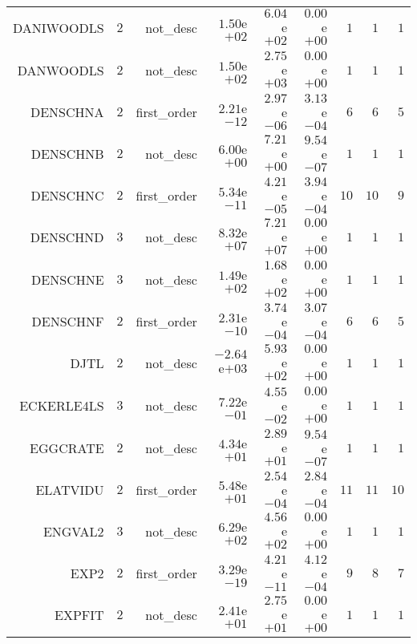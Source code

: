 \begin{longtable}{rrrrrrrrr}
DANIWOODLS & \(     2\) & not\_desc & \( 1.50\)e\(+02\) & \( 6.04\)e\(+02\) & \( 0.00\)e\(+00\) & \(     1\) & \(     1\) & \(     1\) \\
DANWOODLS & \(     2\) & not\_desc & \( 1.50\)e\(+02\) & \( 2.75\)e\(+03\) & \( 0.00\)e\(+00\) & \(     1\) & \(     1\) & \(     1\) \\
DENSCHNA & \(     2\) & first\_order & \( 2.21\)e\(-12\) & \( 2.97\)e\(-06\) & \( 3.13\)e\(-04\) & \(     6\) & \(     6\) & \(     5\) \\
DENSCHNB & \(     2\) & not\_desc & \( 6.00\)e\(+00\) & \( 7.21\)e\(+00\) & \( 9.54\)e\(-07\) & \(     1\) & \(     1\) & \(     1\) \\
DENSCHNC & \(     2\) & first\_order & \( 5.34\)e\(-11\) & \( 4.21\)e\(-05\) & \( 3.94\)e\(-04\) & \(    10\) & \(    10\) & \(     9\) \\
DENSCHND & \(     3\) & not\_desc & \( 8.32\)e\(+07\) & \( 7.21\)e\(+07\) & \( 0.00\)e\(+00\) & \(     1\) & \(     1\) & \(     1\) \\
DENSCHNE & \(     3\) & not\_desc & \( 1.49\)e\(+02\) & \( 1.68\)e\(+02\) & \( 0.00\)e\(+00\) & \(     1\) & \(     1\) & \(     1\) \\
DENSCHNF & \(     2\) & first\_order & \( 2.31\)e\(-10\) & \( 3.74\)e\(-04\) & \( 3.07\)e\(-04\) & \(     6\) & \(     6\) & \(     5\) \\
DJTL & \(     2\) & not\_desc & \(-2.64\)e\(+03\) & \( 5.93\)e\(+02\) & \( 0.00\)e\(+00\) & \(     1\) & \(     1\) & \(     1\) \\
ECKERLE4LS & \(     3\) & not\_desc & \( 7.22\)e\(-01\) & \( 4.55\)e\(-02\) & \( 0.00\)e\(+00\) & \(     1\) & \(     1\) & \(     1\) \\
EGGCRATE & \(     2\) & not\_desc & \( 4.34\)e\(+01\) & \( 2.89\)e\(+01\) & \( 9.54\)e\(-07\) & \(     1\) & \(     1\) & \(     1\) \\
ELATVIDU & \(     2\) & first\_order & \( 5.48\)e\(+01\) & \( 2.54\)e\(-04\) & \( 2.84\)e\(-04\) & \(    11\) & \(    11\) & \(    10\) \\
ENGVAL2 & \(     3\) & not\_desc & \( 6.29\)e\(+02\) & \( 4.56\)e\(+02\) & \( 0.00\)e\(+00\) & \(     1\) & \(     1\) & \(     1\) \\
EXP2 & \(     2\) & first\_order & \( 3.29\)e\(-19\) & \( 4.21\)e\(-11\) & \( 4.12\)e\(-04\) & \(     9\) & \(     8\) & \(     7\) \\
EXPFIT & \(     2\) & not\_desc & \( 2.41\)e\(+01\) & \( 2.75\)e\(+01\) & \( 0.00\)e\(+00\) & \(     1\) & \(     1\) & \(     1\) \\

\end{longtable}
